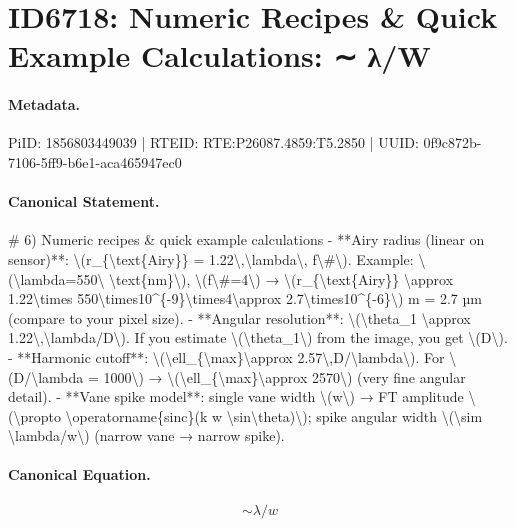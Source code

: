 \section*{ID6718: Numeric Recipes \& Quick Example Calculations: ∼ λ/W}
\paragraph{Metadata.}
PiID: 1856803449039 | RTEID: RTE:P26087.4859:T5.2850 | UUID: 0f9c872b-7106-5ff9-b6e1-aca465947ec0

\paragraph{Canonical Statement.}
\# 6) Numeric recipes \& quick example calculations - **Airy radius (linear on sensor)**: \textbackslash{}(r\_\{\textbackslash{}text\{Airy\}\} = 1.22\textbackslash{},\textbackslash{}lambda\textbackslash{}, f\textbackslash{}\#\textbackslash{}). Example: \textbackslash{}(\textbackslash{}lambda=550\textbackslash{} \textbackslash{}text\{nm\}\textbackslash{}), \textbackslash{}(f\textbackslash{}\#=4\textbackslash{}) → \textbackslash{}(r\_\{\textbackslash{}text\{Airy\}\} \textbackslash{}approx 1.22\textbackslash{}times 550\textbackslash{}times10\textasciicircum{}\{-9\}\textbackslash{}times4\textbackslash{}approx 2.7\textbackslash{}times10\textasciicircum{}\{-6\}\textbackslash{}) m = 2.7 µm (compare to your pixel size). - **Angular resolution**: \textbackslash{}(\textbackslash{}theta\_1 \textbackslash{}approx 1.22\textbackslash{},\textbackslash{}lambda/D\textbackslash{}). If you estimate \textbackslash{}(\textbackslash{}theta\_1\textbackslash{}) from the image, you get \textbackslash{}(D\textbackslash{}). - **Harmonic cutoff**: \textbackslash{}(\textbackslash{}ell\_\{\textbackslash{}max\}\textbackslash{}approx 2.57\textbackslash{},D/\textbackslash{}lambda\textbackslash{}). For \textbackslash{}(D/\textbackslash{}lambda = 1000\textbackslash{}) → \textbackslash{}(\textbackslash{}ell\_\{\textbackslash{}max\}\textbackslash{}approx 2570\textbackslash{}) (very fine angular detail). - **Vane spike model**: single vane width \textbackslash{}(w\textbackslash{}) → FT amplitude \textbackslash{}(\textbackslash{}propto \textbackslash{}operatorname\{sinc\}(k w \textbackslash{}sin\textbackslash{}theta)\textbackslash{}); spike angular width \textbackslash{}(\textbackslash{}sim \textbackslash{}lambda/w\textbackslash{}) (narrow vane → narrow spike).

\paragraph{Canonical Equation.}
\[
\sim \lambda/w
\]

